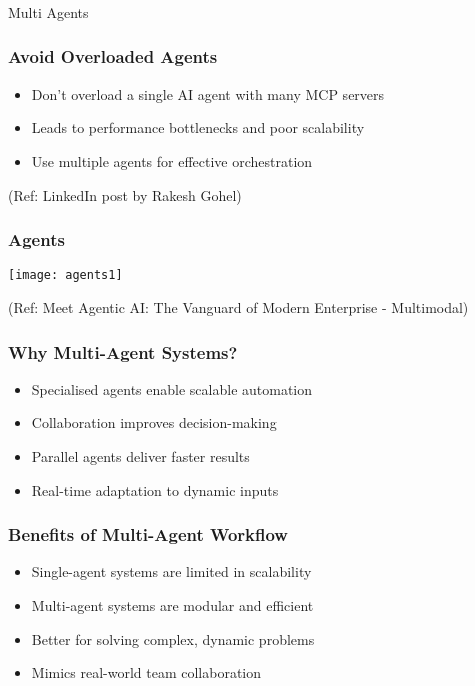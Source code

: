 \begin{frame}[fragile]\frametitle{}
\begin{center}
{\Large Multi Agents}
\end{center}
\end{frame}


\begin{frame}[fragile]\frametitle{Avoid Overloaded Agents}
    \begin{itemize}
        \item Don't overload a single AI agent with many MCP servers
        \item Leads to performance bottlenecks and poor scalability
        \item Use multiple agents for effective orchestration
    \end{itemize}
	
{\tiny (Ref: LinkedIn post by Rakesh Gohel)}
	
\end{frame}

\begin{frame}[fragile]\frametitle{Agents}
	
	\begin{center}
	\texttt{[image: agents1]}
	\end{center}
	
{\tiny (Ref: Meet Agentic AI: The Vanguard of Modern Enterprise - Multimodal)}

\end{frame}


\begin{frame}[fragile]\frametitle{Why Multi-Agent Systems?}
    \begin{itemize}
        \item Specialised agents enable scalable automation
        \item Collaboration improves decision-making
        \item Parallel agents deliver faster results
        \item Real-time adaptation to dynamic inputs
    \end{itemize}
\end{frame}

\begin{frame}[fragile]\frametitle{Benefits of Multi-Agent Workflow}
    \begin{itemize}
        \item Single-agent systems are limited in scalability
        \item Multi-agent systems are modular and efficient
        \item Better for solving complex, dynamic problems
        \item Mimics real-world team collaboration
    \end{itemize}
\end{frame}

